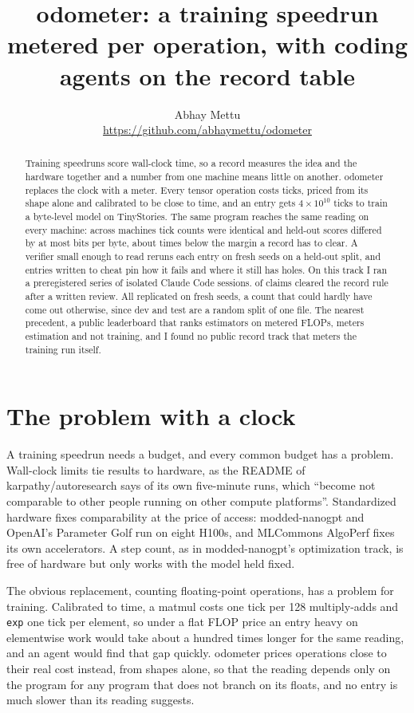 \documentclass[11pt]{article}
\title{odometer: a training speedrun metered per operation, with coding agents on the record table}
\author{Abhay Mettu\\\small\url{https://github.com/abhaymettu/odometer}}
\date{}
\begin{document}
\maketitle

\begin{abstract}
Training speedruns score wall-clock time, so a record measures the idea and the hardware together and a number from one machine means little on another. odometer replaces the clock with a meter. Every tensor operation costs ticks, priced from its shape alone and calibrated to be close to time, and an entry gets $4\times10^{10}$ ticks to train a byte-level model on TinyStories. The same program reaches the same reading on every machine: across \vfairmachines{} machines tick counts were identical and held-out scores differed by at most \vfairmax{} bits per byte, about \vfairratio{} times below the margin a record has to clear. A verifier small enough to read reruns each entry on fresh seeds on a held-out split, and \vattacks{} entries written to cheat pin how it fails and where it still has holes. On this track I ran a preregistered series of \vattempts{} isolated Claude Code sessions. \vrecords{} of \vclaims{} claims cleared the record rule after a written review. All \vsurvived{} replicated on fresh seeds, a count that could hardly have come out otherwise, since dev and test are a random split of one file. The nearest precedent, a public leaderboard that ranks estimators on metered FLOPs, meters estimation and not training, and I found no public record track that meters the training run itself.
\end{abstract}

\section{The problem with a clock}
A training speedrun needs a budget, and every common budget has a problem. Wall-clock limits tie results to hardware, as the README of karpathy/autoresearch says of its own five-minute runs, which ``become not comparable to other people running on other compute platforms''. Standardized hardware fixes comparability at the price of access: modded-nanogpt and OpenAI's Parameter Golf run on eight H100s, and MLCommons AlgoPerf fixes its own accelerators. A step count, as in modded-nanogpt's optimization track, is free of hardware but only works with the model held fixed.

The obvious replacement, counting floating-point operations, has a problem for training. Calibrated to time, a matmul costs one tick per 128 multiply-adds and \texttt{exp} one tick per element, so under a flat FLOP price an entry heavy on elementwise work would take about a hundred times longer for the same reading, and an agent would find that gap quickly. odometer prices operations close to their real cost instead, from shapes alone, so that the reading depends only on the program for any program that does not branch on its floats, and no entry is much slower than its reading suggests.
\end{document}
